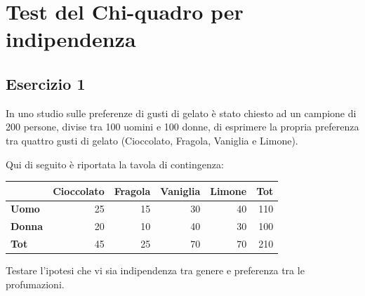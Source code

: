 \documentclass[
  11pt,
]{book}
\theoremstyle{mytheoremstyle}
\theoremstyle{mydefstyle}
\begin{document}
\chapter{Test del Chi-quadro per indipendenza}\label{test-del-chi-quadro-per-indipendenza}

\section{Esercizio 1}\label{esercizio-1}

In uno studio sulle preferenze di gusti di gelato è stato chiesto ad un campione di 200 persone, divise tra 100 uomini e 100 donne, di esprimere la propria preferenza tra quattro gusti di gelato (Cioccolato, Fragola, Vaniglia e Limone).

Qui di seguito è riportata la tavola di contingenza:

\begin{table}[H]
\centering
\begin{tabular}{>{}lrrrrr}
\toprule
  & Cioccolato & Fragola & Vaniglia & Limone & Tot\\
\midrule
\textbf{Uomo} & 25 & 15 & 30 & 40 & 110\\
\textbf{Donna} & 20 & 10 & 40 & 30 & 100\\
\textbf{Tot} & 45 & 25 & 70 & 70 & 210\\
\bottomrule
\end{tabular}
\end{table}

Testare l'ipotesi che vi sia indipendenza tra genere e preferenza tra le profumazioni.
\end{document}
